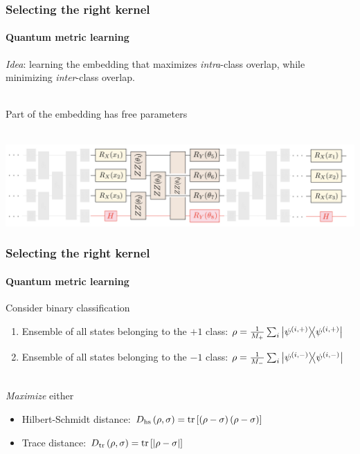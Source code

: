 \documentclass[aspectratio=43]{beamer}
\begin{document}
\begin{frame}
  \frametitle{Selecting the right kernel}
  \framesubtitle{Quantum metric learning}

  \emph{Idea}: learning the embedding that maximizes \emph{intra}-class overlap, while minimizing \emph{inter}-class overlap.

  \ \\
  Part of the embedding has free parameters

  \ \\
  \centering
  \includegraphics[width=.6\textwidth]{pics/lloyd-learnable-embedding.png}

\end{frame}


\begin{frame}
  \frametitle{Selecting the right kernel}
  \framesubtitle{Quantum metric learning}

  Consider binary classification
  \begin{enumerate}
    \item Ensemble of all states belonging to the $+1$ class: $\rho = \frac{1}{M_+}\sum_i \ketbra{\psi^{(i,+)}}$
    \item Ensemble of all states belonging to the $-1$ class: $\rho = \frac{1}{M_-}\sum_i \ketbra{\psi^{(i,-)}}$
  \end{enumerate}

  \ \\
  \emph{Maximize} either
  \begin{itemize}
    \item Hilbert-Schmidt distance: $D_{\mathrm{hs}}\left( \rho,\sigma \right) = \tr\left[ \left( \rho - \sigma \right)\left( \rho - \sigma \right) \right]$
    \item Trace distance: $D_{\mathrm{tr}}\left( \rho,\sigma \right) = \tr\left[ \abs{ \rho - \sigma } \right]$
  \end{itemize}

\end{frame}
\end{document}
